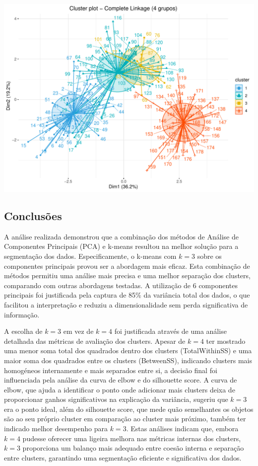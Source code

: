 \documentclass[
  letterpaper,
  DIV=11,
  numbers=noendperiod]{scrartcl}
\begin{document}
\includegraphics{wines_analysis_files/figure-pdf/unnamed-chunk-41-1.pdf}

\subsection{Conclusões}\label{conclusuxf5es}

A análise realizada demonstrou que a combinação dos métodos de Análise
de Componentes Principais (PCA) e k-means resultou na melhor solução
para a segmentação dos dados. Especificamente, o k-means com \(k = 3\)
sobre os componentes principais provou ser a abordagem mais eficaz. Esta
combinação de métodos permitiu uma análise mais precisa e uma melhor
separação dos clusters, comparando com outras abordagens testadas. A
utilização de 6 componentes principais foi justificada pela captura de
85\% da variância total dos dados, o que facilitou a interpretação e
reduziu a dimensionalidade sem perda significativa de informação.

A escolha de \(k = 3\) em vez de \(k = 4\) foi justificada através de
uma análise detalhada das métricas de avaliação dos clusters. Apesar de
\(k = 4\) ter mostrado uma menor soma total dos quadrados dentro dos
clusters (TotalWithinSS) e uma maior soma dos quadrados entre os
clusters (BetweenSS), indicando clusters mais homogéneos internamente e
mais separados entre si, a decisão final foi influenciada pela análise
da curva de elbow e do silhouette score. A curva de elbow, que ajuda a
identificar o ponto onde adicionar mais clusters deixa de proporcionar
ganhos significativos na explicação da variância, sugeriu que \(k = 3\)
era o ponto ideal, além do silhouette score, que mede quão semelhantes
os objetos são ao seu próprio cluster em comparação ao cluster mais
próximo, também ter indicado melhor desempenho para \(k = 3\). Estas
análises indicam que, embora \(k = 4\) pudesse oferecer uma ligeira
melhora nas métricas internas dos clusters, \(k = 3\) proporciona um
balanço mais adequado entre coesão interna e separação entre clusters,
garantindo uma segmentação eficiente e significativa dos dados.
\end{document}

